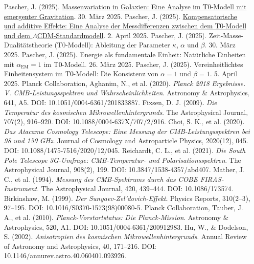 \documentclass[12pt,a4paper]{article}
\newcommand{\alphaEM}{\alpha_{\text{EM}}}
\begin{document}
	\begin{thebibliography}{9}
		 Pascher, J. (2025). \href{https://github.com/jpascher/T0-Time-Mass-Duality/tree/main/2/pdf/Deutsch/Massenvariation in Galaxien - Eine Analyse im T0-Modell mit emergenter Gravitation.pdf}{Massenvariation in Galaxien: Eine Analyse im T0-Modell mit emergenter Gravitation}. 30. März 2025.
		 Pascher, J. (2025). \href{https://github.com/jpascher/T0-Time-Mass-Duality/tree/main/2/pdf/Deutsch/Analyse der Messdifferenzen zwischen dem T0-Modell und dem Standardmodell.pdf}{Kompensatorische und additive Effekte: Eine Analyse der Messdifferenzen zwischen dem T0-Modell und dem \(\Lambda\)CDM-Standardmodell}. 2. April 2025.
		 Pascher, J. (2025). Zeit-Masse-Dualitätstheorie (T0-Modell): Ableitung der Parameter \(\kappa\), \(\alpha\) und \(\beta\). 30. März 2025.
		 Pascher, J. (2025). Energie als fundamentale Einheit: Natürliche Einheiten mit \(\alphaEM = 1\) im T0-Modell. 26. März 2025.
		 Pascher, J. (2025). Vereinheitlichtes Einheitensystem im T0-Modell: Die Konsistenz von \(\alpha = 1\) und \(\beta = 1\). 5. April 2025.
		Planck Collaboration, Aghanim, N., et al. (2020). 
		\textit{Planck 2018 Ergebnisse. V. CMB-Leistungsspektren und Wahrscheinlichkeiten}. 
		Astronomy \& Astrophysics, 641, A5. 
		DOI: 10.1051/0004-6361/201833887.
		Fixsen, D. J. (2009). \textit{Die Temperatur des kosmischen Mikrowellenhintergrunds}. 
		The Astrophysical Journal, 707(2), 916–920. 
		DOI: 10.1088/0004-637X/707/2/916.
		Choi, S. K., et al. (2020).
		\textit{Das Atacama Cosmology Telescope: Eine Messung der CMB-Leistungsspektren bei 98 und 150 GHz}.
		Journal of Cosmology and Astroparticle Physics, 2020(12), 045. 
		DOI: 10.1088/1475-7516/2020/12/045.
		Reichardt, C. L., et al. (2021). \textit{Die South Pole Telescope 3G-Umfrage: CMB-Temperatur- und Polarisationsspektren}. 
		The Astrophysical Journal, 908(2), 199. 
		DOI: 10.3847/1538-4357/abd407.
		Mather, J. C., et al. (1994). \textit{Messung des CMB-Spektrums durch das COBE FIRAS-Instrument}. 
		The Astrophysical Journal, 420, 439–444. 
		DOI: 10.1086/173574.
		Birkinshaw, M. (1999). \textit{Der Sunyaev-Zel'dovich-Effekt}. 
		Physics Reports, 310(2–3), 97–195.
		DOI: 10.1016/S0370-1573(98)00080-5.
		Planck Collaboration, Tauber, J. A., et al. (2010). \textit{Planck-Vorstartstatus: Die Planck-Mission}. 
		Astronomy \& Astrophysics, 520, A1. 
		DOI: 10.1051/0004-6361/200912983.
		Hu, W., \& Dodelson, S. (2002). \textit{Anisotropien des kosmischen Mikrowellenhintergrunds}. 
		Annual Review of Astronomy and Astrophysics, 40, 171–216. 
		DOI: 10.1146/annurev.astro.40.060401.093926.
	\end{thebibliography}
	
	
\end{document}
